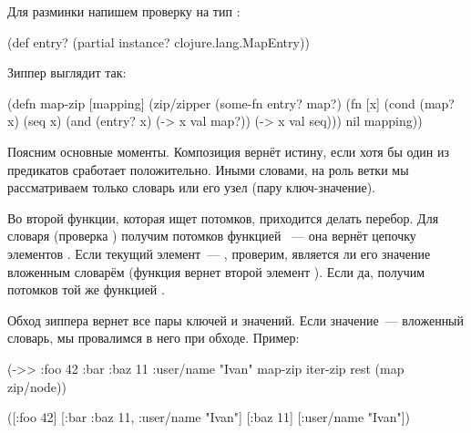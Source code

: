 Для разминки напишем проверку на тип :

\begin{english}
  \begin{clojure}
(def entry?
  (partial instance? clojure.lang.MapEntry))
  \end{clojure}
\end{english}

Зиппер  выглядит так:

\begin{english}
  \begin{clojure/lines}
(defn map-zip [mapping]
  (zip/zipper
   (some-fn entry? map?)
   (fn [x]
     (cond
       (map? x)
       (seq x)
       (and (entry? x) (-> x val map?))
       (-> x val seq)))
   nil
   mapping))
  \end{clojure/lines}
\end{english}

Поясним основные моменты. Композиция   вернёт истину,
если хотя бы один из предикатов сработает положительно. Иными словами, на роль
ветки мы рассматриваем только словарь или его узел (пару ключ-значение).

Во второй функции, которая ищет потомков, приходится делать перебор. Для словаря
(проверка ) получим потомков функцией ~--- она вернёт цепочку
элементов . Если текущий элемент~--- , проверим, является ли
его значение вложенным словарём (функция  вернет второй элемент
). Если да, получим потомков той же функцией .

Обход зиппера вернет все пары ключей и значений. Если значение~--- вложенный
словарь, мы провалимся в него при обходе. Пример:

\iflarge

\begin{english}
  \begin{clojure}
(->> {:foo 42
      :bar {:baz 11
            :user/name "Ivan"}}
     map-zip
     iter-zip
     rest
     (map zip/node))
  \end{clojure}
\end{english}

\begin{english}
  \begin{clojure}
([:foo 42]
 [:bar {:baz 11, :user/name "Ivan"}]
 [:baz 11]
 [:user/name "Ivan"])
  \end{clojure}
\end{english}

